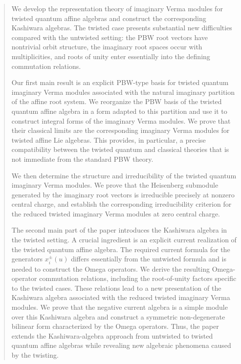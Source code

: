 \documentclass[12pt]{amsart}
\numberwithin{equation}{section}
\begin{document}
\begin{abstract}
We develop the representation theory of imaginary Verma modules for twisted quantum affine algebras and construct the corresponding Kashiwara algebras. The twisted case presents substantial new difficulties compared with the untwisted setting: the PBW root vectors have nontrivial orbit structure, the imaginary root spaces occur with multiplicities, and roots of unity enter essentially into the defining commutation relations.

Our first main result is an explicit PBW-type basis for twisted quantum imaginary Verma modules associated with the natural imaginary partition of the affine root system. We reorganize the PBW basis of the twisted quantum affine algebra in a form adapted to this partition and use it to construct integral forms of the imaginary Verma modules. We prove that their classical limits are the corresponding imaginary Verma modules for twisted affine Lie algebras. This provides, in particular, a precise compatibility between the twisted quantum and classical theories that is not immediate from the standard PBW theory.

We then determine the structure and irreducibility of the twisted quantum imaginary Verma modules. We prove that the Heisenberg submodule generated by the imaginary root vectors is irreducible precisely at nonzero central charge, and establish the corresponding irreducibility criterion for the reduced twisted imaginary Verma modules at zero central charge.

The second main part of the paper introduces the Kashiwara algebra in the twisted setting. A crucial ingredient is an explicit current realization of the twisted quantum affine algebra. The required current formula for the generators $x_i^\pm(u)$ differs essentially from the untwisted formula and is needed to construct the Omega operators. We derive the resulting Omega-operator commutation relations, including the root-of-unity factors specific to the twisted cases. These relations lead to a new presentation of the Kashiwara algebra associated with the reduced twisted imaginary Verma modules. We prove that the negative current algebra is a simple module over this Kashiwara algebra and construct a symmetric non-degenerate bilinear form characterized by the Omega operators. Thus, the paper extends the Kashiwara-algebra approach from untwisted to twisted quantum affine algebras while revealing new algebraic phenomena caused by the twisting.
\end{abstract}
\end{document}
